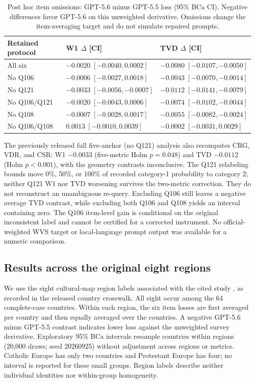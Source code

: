 \begin{table}[!t]
\centering
\caption{Post hoc item omissions: GPT-5.6 minus GPT-5.5 loss (95\% BCa CI).
Negative differences favor GPT-5.6 on this unweighted derivative. Omissions
change the item-averaging target and do not simulate repaired prompts.}
\label{tab:wording-omissions}
\scriptsize
\setlength{\tabcolsep}{3pt}
\begin{tabular}{p{.30\linewidth}p{.31\linewidth}p{.31\linewidth}}
\toprule
\rowcolor{tablehead}
Retained protocol & W1 $\Delta$ [CI] & TVD $\Delta$ [CI] \\
\midrule
All six & $-0.0020\;[-0.0040,0.0002]$ & $-0.0080\;[-0.0107,-0.0050]$ \\
No Q106 & $-0.0006\;[-0.0027,0.0018]$ & $-0.0043\;[-0.0070,-0.0014]$ \\
No Q121 & $-0.0033\;[-0.0056,-0.0007]$ & $-0.0112\;[-0.0141,-0.0079]$ \\
No Q106/Q121 & $-0.0020\;[-0.0043,0.0006]$ & $-0.0074\;[-0.0102,-0.0044]$ \\
No Q108 & $-0.0007\;[-0.0028,0.0017]$ & $-0.0055\;[-0.0082,-0.0024]$ \\
No Q106/Q108 & $0.0013\;[-0.0010,0.0039]$ & $-0.0002\;[-0.0031,0.0029]$ \\
\bottomrule
\end{tabular}
\end{table}

The previously released full five-anchor (no Q121) analysis also recomputes
CRG, VDR, and CSR: W1 $-0.0033$ (five-metric Holm $p=0.048$) and TVD
$-0.0112$ (Holm $p<0.001$), with the geometry contrasts inconclusive.
The Q121 relabeling bounds move 0\%, 50\%, or 100\% of recorded category-1
probability to category 2; neither Q121 W1 nor TVD worsening survives the
two-metric correction. They do not reconstruct an unambiguous re-query.
Excluding Q106 still leaves a negative average TVD contrast, while excluding
both Q106 and Q108 yields an interval containing zero. The Q106 item-level
gain is conditional on the original inconsistent label and cannot be
certified for a corrected instrument. No official-weighted WVS target or
local-language prompt output was available for a numeric comparison.

\subsection{Results across the original eight regions}
We use the eight cultural-map region labels associated with the cited study
\citep{tao2024cultural,wvs2023culturalmap}, as recorded in the released
country crosswalk. All eight occur among the 64 complete-case countries.
Within each region, the six item losses are first averaged per country and
then equally averaged over the countries. A negative GPT-5.6 minus GPT-5.5
contrast indicates lower loss against the unweighted survey derivative.
Exploratory 95\% BCa intervals resample countries within regions (20,000
draws; seed 20260925) without adjustment across regions or metrics.
Catholic Europe has only two countries and Protestant Europe has four; no
interval is reported for these small groups. Region labels describe neither
individual identities nor within-group homogeneity.

